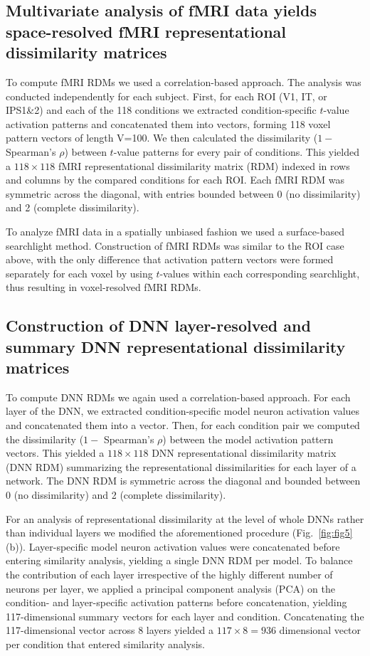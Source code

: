 \documentclass[10pt,twocolumn,letterpaper]{article}
\begin{document}
\subsection{Multivariate analysis of fMRI data yields space-resolved fMRI representational dissimilarity matrices}
To compute fMRI RDMs we used a correlation-based approach. The analysis was conducted independently for each subject. First, for each ROI (V1, IT, or IPS1\&2) and each of the 118 conditions we extracted condition-specific $t$-value activation patterns and concatenated them into vectors, forming 118 voxel pattern vectors of length V=100. We then calculated the dissimilarity ($1 -$ Spearman's $\rho$) between $t$-value patterns for every pair of conditions. This yielded a $118\times118$ fMRI representational dissimilarity matrix (RDM) indexed in rows and columns by the compared conditions for each ROI. Each fMRI RDM was symmetric across the diagonal, with entries bounded between 0 (no dissimilarity) and 2 (complete dissimilarity).

To analyze fMRI data in a spatially unbiased fashion we used a surface-based searchlight method. Construction of fMRI RDMs was similar to the ROI case above, with the only difference that activation pattern vectors were formed separately for each voxel by using $t$-values within each corresponding searchlight, thus resulting in voxel-resolved fMRI RDMs.

\subsection{Construction of DNN layer-resolved and summary DNN representational dissimilarity matrices}
To compute DNN RDMs we again used a correlation-based approach. For each layer of the DNN, we extracted condition-specific model neuron activation values and concatenated them into a vector. Then, for each condition pair we computed the dissimilarity ($1-$ Spearman's $\rho$) between the model activation pattern vectors. This yielded a $118\times118$ DNN representational dissimilarity matrix (DNN RDM) summarizing the representational dissimilarities for each layer of a network. The DNN RDM is symmetric across the diagonal and bounded between 0 (no dissimilarity) and 2 (complete dissimilarity).

For an analysis of representational dissimilarity at the level of whole DNNs rather than individual layers we modified the aforementioned procedure (Fig.~\ref{fig:fig5}(b)). Layer-specific model neuron activation values were concatenated before entering similarity analysis, yielding a single DNN RDM per model. To balance the contribution of each layer irrespective of the highly different number of neurons per layer, we applied a principal component analysis (PCA) on the condition- and layer-specific activation patterns before concatenation, yielding 117-dimensional summary vectors for each layer and condition. Concatenating the 117-dimensional vector across 8 layers yielded a $117\times8=936$ dimensional vector per condition that entered similarity analysis.
\end{document}
